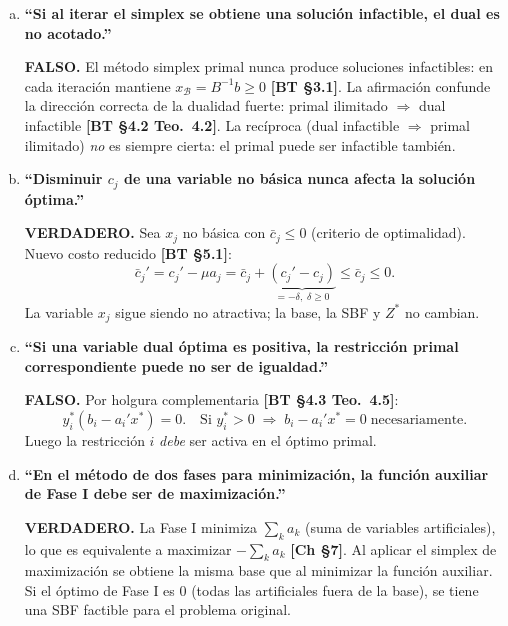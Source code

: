 \documentclass{article}
\begin{document}
\begin{enumerate}[a)]

\item \textbf{``Si al iterar el simplex se obtiene una solución infactible, el dual es no acotado.''}

\textbf{FALSO.} El método simplex primal nunca produce soluciones infactibles: en cada iteración mantiene $x_{\mathcal{B}} = B^{-1}b \geq 0$ \textbf{[BT §3.1]}. La afirmación confunde la dirección correcta de la dualidad fuerte: primal ilimitado $\Rightarrow$ dual infactible \textbf{[BT §4.2 Teo.\ 4.2]}. La recíproca (dual infactible $\Rightarrow$ primal ilimitado) \emph{no} es siempre cierta: el primal puede ser infactible también.

\item \textbf{``Disminuir $c_j$ de una variable no básica nunca afecta la solución óptima.''}

\textbf{VERDADERO.} Sea $x_j$ no básica con $\bar{c}_j \leq 0$ (criterio de optimalidad). Nuevo costo reducido \textbf{[BT §5.1]}:
\[
  \bar{c}_j' = c_j' - \mu a_j = \bar{c}_j + \underbrace{(c_j' - c_j)}_{= -\delta,\;\delta\geq 0} \leq \bar{c}_j \leq 0.
\]
La variable $x_j$ sigue siendo no atractiva; la base, la SBF y $Z^*$ no cambian.

\item \textbf{``Si una variable dual óptima es positiva, la restricción primal correspondiente puede no ser de igualdad.''}

\textbf{FALSO.} Por holgura complementaria \textbf{[BT §4.3 Teo.\ 4.5]}:
\[
  y_i^*(b_i - a_i' x^*) = 0. \quad \text{Si } y_i^* > 0 \;\Rightarrow\; b_i - a_i'x^* = 0 \;\text{necesariamente.}
\]
Luego la restricción $i$ \emph{debe} ser activa en el óptimo primal.

\item \textbf{``En el método de dos fases para minimización, la función auxiliar de Fase I debe ser de maximización.''}

\textbf{VERDADERO.} La Fase I minimiza $\sum_k a_k$ (suma de variables artificiales), lo que es equivalente a maximizar $-\sum_k a_k$ \textbf{[Ch §7]}. Al aplicar el simplex de maximización se obtiene la misma base que al minimizar la función auxiliar. Si el óptimo de Fase I es $0$ (todas las artificiales fuera de la base), se tiene una SBF factible para el problema original.

\end{enumerate}

\end{document}
